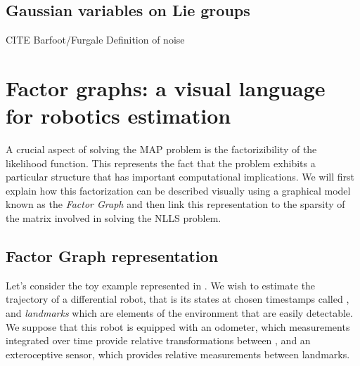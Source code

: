 \subsection{Gaussian variables on Lie groups}

CITE Barfoot/Furgale
Definition of noise 



%
%
%
\section{Factor graphs: a visual language for robotics estimation}
A crucial aspect of solving the MAP problem is the factorizibility of the likelihood function. This represents the fact that the problem
exhibits a particular structure that has important computational implications. We will first explain how this factorization can be described 
visually using a graphical model known as the \textit{Factor Graph} and then link this representation to the sparsity of the matrix involved
in solving the NLLS problem.


\subsection{Factor Graph representation}
Let's consider the toy example represented in . 
We wish to estimate the trajectory of a differential robot, that is its states at chosen timestamps called \textit{\keyframes}, and \textit{landmarks} which are elements of the 
environment that are easily detectable. We suppose that this robot is equipped with an odometer, which measurements integrated over time provide relative 
transformations between \keyframes, and an exteroceptive sensor, which provides relative measurements between \keyframes landmarks.

